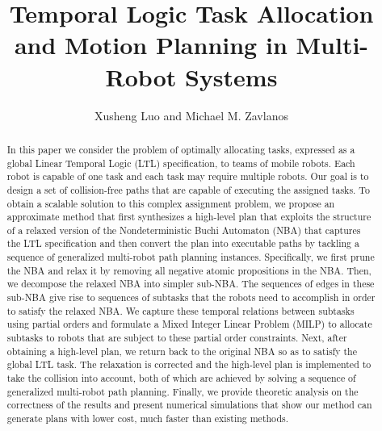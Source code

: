 \documentclass[Afour,sageh,times]{sagej}
\begin{document}

\author{Xusheng Luo and Michael M. Zavlanos}




\title{Temporal Logic Task Allocation and Motion Planning in Multi-Robot Systems}

\begin{abstract}
  In this paper we consider the problem of optimally allocating tasks, expressed as a global Linear Temporal Logic (LTL) specification, to teams of mobile robots. Each robot is capable of one task and each task may require multiple robots. Our goal is to design a set of collision-free paths that are capable of executing the assigned tasks.
    To obtain a scalable solution to this complex assignment problem, we propose an approximate method that first synthesizes a high-level plan  that exploits the structure of a relaxed version of the Nondeterministic Buchi Automaton (NBA) that captures the LTL specification and then convert the plan into executable paths by tackling a sequence of generalized multi-robot path planning instances. Specifically, we first prune the NBA and relax it by removing all negative atomic propositions in the NBA. Then, we decompose the relaxed NBA into simpler sub-NBA. The sequences of edges in these sub-NBA give rise to sequences of subtasks that the robots need to accomplish in order to satisfy the relaxed NBA. We capture these temporal relations between subtasks using partial orders and formulate a Mixed Integer Linear Problem (MILP) to allocate subtasks to robots that are subject to these partial order constraints. Next, after obtaining a high-level plan, we return back to the original NBA so as to satisfy the global LTL task. The relaxation is corrected and the high-level plan is implemented to take the collision into account, both of which are achieved by solving a sequence of generalized multi-robot path planning. Finally, we provide theoretic analysis on the correctness of the results and present numerical simulations that show our method can generate plans with lower cost, much faster than existing methods.
\end{abstract}
\end{document}
